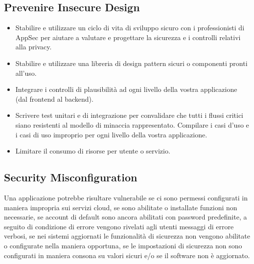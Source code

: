 \subsection{Prevenire Insecure Design} 
\begin{itemize}
    \item Stabilire e utilizzare un ciclo di vita di sviluppo sicuro con i professionisti di AppSec per aiutare a valutare e progettare la sicurezza e i controlli relativi alla privacy.
    \item Stabilire e utilizzare una libreria di design pattern sicuri o componenti pronti all'uso.
    \item Integrare i controlli di plausibilità ad ogni livello della vostra applicazione (dal frontend al backend).
    \item Scrivere test unitari e di integrazione per convalidare che tutti i flussi critici siano resistenti al modello di minaccia rappresentato. Compilare i casi d'uso e i casi di uso improprio per ogni livello della vostra applicazione.
    \item Limitare il consumo di risorse per utente o servizio.  
\end{itemize}
\subsection{Security Misconfiguration}
Una applicazione potrebbe risultare vulnerabile se ci sono permessi configurati in maniera impropria sui servizi cloud, se sono abilitate o installate funzioni non necessarie, se account di default sono ancora abilitati con password predefinite, a seguito di condizione di errore vengono rivelati agli utenti messaggi di errore verbosi, se nei sistemi aggiornati le funzionalità di sicurezza non vengono abilitate o configurate nella maniera opportuna, se le impostazioni di sicurezza non sono configurati in maniera consona su valori sicuri e/o se  il software non è aggiornato.
